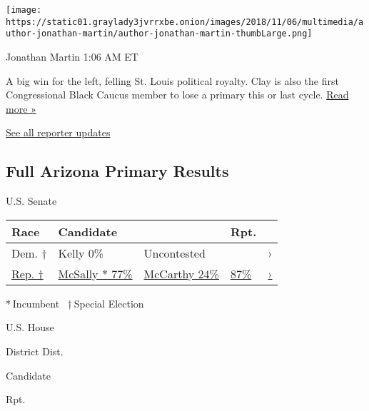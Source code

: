 \texttt{[image: https://static01.graylady3jvrrxbe.onion/images/2018/11/06/multimedia/author-jonathan-martin/author-jonathan-martin-thumbLarge.png]}

Jonathan Martin 1:06 AM ET

A big win for the left, felling St. Louis political royalty. Clay is
also the first Congressional Black Caucus member to lose a primary this
or last cycle.
\href{https://www.nytimes3xbfgragh.onion/2020/08/05/us/politics/cori-bush-missouri-william-lacy-clay.html?action=click\&module=ELEX_results\&pgtype=Interactive\&region=ReporterUpdates}{Read
more »}

\href{https://www.nytimes3xbfgragh.onion/interactive/2020/08/04/us/elections/live-analysis-arizona-kansas-michigan-missouri-primaries.html?action=click\&module=ELEX_results\&pgtype=Interactive\&region=Component}{See
all reporter updates}

\hypertarget{full-arizona-primary-results}{%
\subsection{Full Arizona Primary
Results}\label{full-arizona-primary-results}}

U.S. Senate

\begin{longtable}[]{@{}lllll@{}}
\toprule
Race & Candidate & & Rpt. &\tabularnewline
\midrule
\endhead
Dem. † & Kelly 0\% & Uncontested & & ›\tabularnewline
\href{https://www.nytimes3xbfgragh.onion/interactive/2020/08/04/us/elections/results-arizona-senate-special-primary-election.html}{Rep.
†} &
\href{https://www.nytimes3xbfgragh.onion/interactive/2020/08/04/us/elections/results-arizona-senate-special-primary-election.html}{
McSally * 77\% } &
\href{https://www.nytimes3xbfgragh.onion/interactive/2020/08/04/us/elections/results-arizona-senate-special-primary-election.html}{
McCarthy 24\% } &
\href{https://www.nytimes3xbfgragh.onion/interactive/2020/08/04/us/elections/results-arizona-senate-special-primary-election.html}{87\%}
&
\href{https://www.nytimes3xbfgragh.onion/interactive/2020/08/04/us/elections/results-arizona-senate-special-primary-election.html}{›}\tabularnewline
\bottomrule
\end{longtable}

* Incumbent~ † Special Election

U.S. House

District Dist.

Candidate

Rpt.

